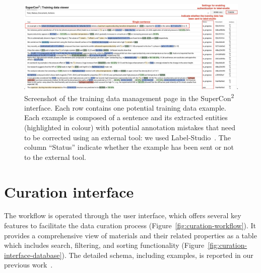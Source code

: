 \begin{figure}[ht]
  \centering
  \includegraphics[width=1\textwidth]{figures/curation/training-data-viewer} 
  \caption{Screenshot of the training data management page in the SuperCon\textsuperscript{2} interface. Each row contains one potential training data example. Each example is composed of a sentence and its extracted entities (highlighted in colour) with potential annotation mistakes that need to be corrected using an external tool: we used Label-Studio~\cite{Label_Studio}. The column ``Status'' indicate whether the example has been sent or not to the external tool.}
  \label{fig:training-data-view}
\end{figure}

\section{Curation interface}
\label{sec:user-interface}

The workflow is operated through the user interface, which offers several key features to facilitate the data curation process (Figure~\ref{fig:curation-workflow}).
It provides a comprehensive view of materials and their related properties as a table which includes search, filtering, and sorting functionality (Figure~\ref{fig:curation-interface-database}). 
The detailed schema, including examples, is reported in our previous work~\cite{foppiano2023automatic}.

